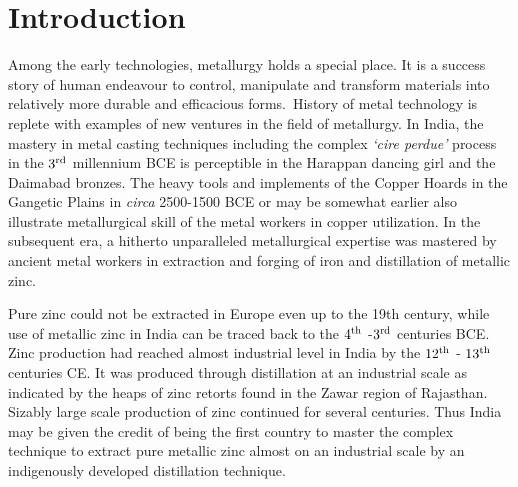 \chapter{Introduction}\label{chapter1}


\vspace{-.3cm}

Among the early technologies, metallurgy holds a special place. It is a success story of human endeavour to control, manipulate and transform materials into relatively more durable and efficacious forms.~History of metal technology is replete with examples of new ventures in the field of metallurgy. In India, the mastery in metal casting techniques including the complex \textit{`cire perdue'} process in the $3^{\rm rd}$ millennium BCE is perceptible in the Harappan dancing girl and the Daimabad bronzes. The heavy tools and implements of the Copper Hoards in the Gangetic Plains in \textit{circa} 2500-1500 BCE or may be somewhat earlier also illustrate metallurgical skill of the metal workers in copper utilization. In the subsequent era, a hitherto unparalleled metallurgical expertise was mastered by ancient metal workers in extraction and forging of iron and distillation of metallic zinc.

Pure zinc could not be extracted in Europe even up to the 19th century, while use of metallic zinc in India can be traced back to the $4^{\rm th}$ -$3^{\rm rd}$ centuries BCE. Zinc production had reached almost industrial level in India by the $12^{\rm th}$ - $13^{\rm th}$ centuries CE. It was produced through distillation at an industrial scale as indicated by the heaps of zinc retorts found in the Zawar region of Rajasthan. Sizably large scale production of zinc continued for several centuries. Thus India may be given the credit of being the first country to master the complex technique to extract pure metallic zinc almost on an industrial scale by an indigenously developed distillation technique.

